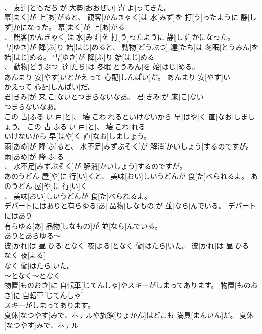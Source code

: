 \documentclass[8pt]{extreport}
\begin{document}
\begin{CJK}{UTF8}{min}
\\	、 友達[ともだち]が 大勢[おおぜい] 寄[よ]ってきた。	
\\	幕[まく]が 上[あ]がると、 観客[かんきゃく]は 水[みず]を 打[う]ったように 静[しず]かになった。	幕[まく]が 上[あ]がる
\\	、 観客[かんきゃく]は 水[みず]を 打[う]ったように 静[しず]かになった。	
\\	雪[ゆき]が 降[ふ]り 始[はじ]めると、 動物[どうぶつ] 達[たち]は 冬眠[とうみん]を 始[はじ]める。	雪[ゆき]が 降[ふ]り 始[はじ]める
\\	、 動物[どうぶつ] 達[たち]は 冬眠[とうみん]を 始[はじ]める。	
\\	あんまり 安[やす]いとかえって 心配[しんぱい]だ。	あんまり 安[やす]い
\\	かえって 心配[しんぱい]だ。	
\\	君[きみ]が 来[こ]ないとつまらないなあ。	君[きみ]が 来[こ]ない
\\	つまらないなあ。	
\\	この 古[ふる]い 戸[と]、 壊[こわ]れるといけないから 早[はや]く 直[なお]しましょう。	この 古[ふる]い 戸[と]、 壊[こわ]れる
\\	いけないから 早[はや]く 直[なお]しましょう。	
\\	雨[あめ]が 降[ふ]ると、 水不足[みずぶそく]が 解消[かいしょう]するのですが。	雨[あめ]が 降[ふ]る
\\	、 水不足[みずぶそく]が 解消[かいしょう]するのですが。	
\\	あのうどん 屋[や]に 行[い]くと、 美味[おい]しいうどんが 食[た]べられるよ。	あのうどん 屋[や]に 行[い]く
\\	、 美味[おい]しいうどんが 食[た]べられるよ。	
\\	デパートにはありと有らゆる[あ] 品物[しなもの]が 並[なら]んでいる。	デパートにはあり
\\	有らゆる[あ] 品物[しなもの]が 並[なら]んでいる。	
\\	ありとあらゆる～
\\	彼[かれ]は 昼[ひる]となく 夜[よる]となく 働[はたら]いた。	彼[かれ]は 昼[ひる]
\\	なく 夜[よる]
\\	なく 働[はたら]いた。	
\\	～となく～となく
\\	物置[ものおき]に 自転車[じてんしゃ]やスキーがしまってあります。	物置[ものおき]に 自転車[じてんしゃ]
\\	スキーがしまってあります。	
\\	夏休[なつやす]みで、ホテルや旅館[りょかん]はどこも 満員[まんいん]だ。	夏休[なつやす]みで、ホテル

\end{CJK}
\end{document}

